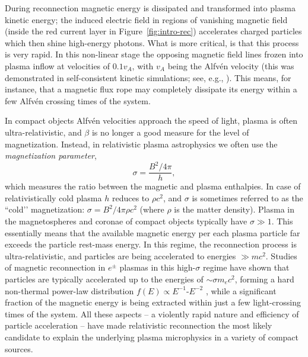 During reconnection magnetic energy is dissipated and transformed into plasma kinetic energy; the induced electric field in regions of vanishing magnetic field (inside the red current layer in Figure~\ref{fig:intro-rec}) accelerates charged particles which then shine high-energy photons. What is more critical, is that this process is very rapid. In this non-linear stage the opposing magnetic field lines frozen into plasma inflow at velocities of $0.1 v_A$, with $v_A$ being the Alfv\'en velocity (this was demonstrated in self-consistent kinetic simulations; see, e.g., \citealt{2008ApJ...684.1477Z,2012ApJ...750..129B,2014A&A...570A.111M}). This means, for instance, that a magnetic flux rope may completely dissipate its energy within a few Alfv\'en crossing times of the system. 

In compact objects Alfv\'en velocities approach the speed of light, plasma is often ultra-relativistic, and $\beta$ is no longer a good measure for the level of magnetization. Instead, in relativistic plasma astrophysics we often use the \emph{magnetization parameter},
\begin{equation*}
\sigma = \frac{B^2/4\pi}{h},
\end{equation*}
which measures the ratio between the magnetic and plasma enthalpies. In case of relativistically cold plasma $h$ reduces to $\rho c^2$, and $\sigma$ is sometimes referred to as the ``cold’’ magnetization: $\sigma = B^2 / 4\pi \rho c^2$ (where $\rho$ is the matter density). Plasma in the magnetospheres and coronae of compact objects typically have $\sigma\gg1$. This essentially means that the available magnetic energy per each plasma particle far exceeds the particle rest-mass energy. In this regime, the reconnection process is ultra-relativistic, and particles are being accelerated to energies $\gg m c^2$. Studies of magnetic reconnection in $e^\pm$ plasmas in this high-$\sigma$ regime have shown that particles are typically accelerated up to the energies of $\sim \sigma m_e c^2$, forming a hard non-thermal power-law distribution $f(E)\propto E^{-1}\text{-}E^{-2}$ \citep[e.g.,][]{2014PhRvL.113o5005G, 2014ApJ...783L..21S,  2016ApJ...816L...8W}, while a significant fraction of the magnetic energy is being extracted within just a few light-crossing times of the system. All these aspects -- a violently rapid nature and efficiency of particle acceleration -- have made relativistic reconnection the most likely candidate to explain the underlying plasma microphysics in a variety of compact sources.

